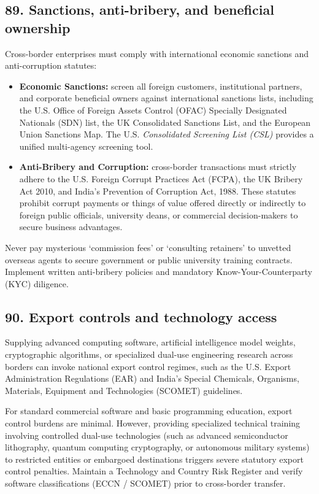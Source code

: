 \subsection{89. Sanctions, anti-bribery, and beneficial ownership}

Cross-border enterprises must comply with international economic sanctions and anti-corruption statutes:
\begin{itemize}
    \item \textbf{Economic Sanctions:} screen all foreign customers, institutional partners, and corporate beneficial owners against international sanctions lists, including the U.S. Office of Foreign Assets Control (OFAC) Specially Designated Nationals (SDN) list, the UK Consolidated Sanctions List, and the European Union Sanctions Map. The U.S. \textit{Consolidated Screening List (CSL)} provides a unified multi-agency screening tool.
    \item \textbf{Anti-Bribery and Corruption:} cross-border transactions must strictly adhere to the U.S. Foreign Corrupt Practices Act (FCPA), the UK Bribery Act 2010, and India's Prevention of Corruption Act, 1988. These statutes prohibit corrupt payments or things of value offered directly or indirectly to foreign public officials, university deans, or commercial decision-makers to secure business advantages.
\end{itemize}
Never pay mysterious `commission fees' or `consulting retainers' to unvetted overseas agents to secure government or public university training contracts. Implement written anti-bribery policies and mandatory Know-Your-Counterparty (KYC) diligence.

\subsection{90. Export controls and technology access}

Supplying advanced computing software, artificial intelligence model weights, cryptographic algorithms, or specialized dual-use engineering research across borders can invoke national export control regimes, such as the U.S. Export Administration Regulations (EAR) and India's Special Chemicals, Organisms, Materials, Equipment and Technologies (SCOMET) guidelines.

For standard commercial software and basic programming education, export control burdens are minimal. However, providing specialized technical training involving controlled dual-use technologies (such as advanced semiconductor lithography, quantum computing cryptography, or autonomous military systems) to restricted entities or embargoed destinations triggers severe statutory export control penalties. Maintain a Technology and Country Risk Register and verify software classifications (ECCN / SCOMET) prior to cross-border transfer.

